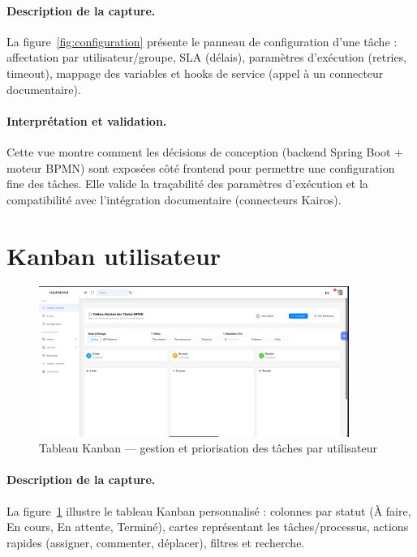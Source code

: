 \paragraph{Description de la capture.}  
La figure~\ref{fig:configuration} présente le panneau de configuration d’une tâche : affectation par utilisateur/groupe, SLA (délais), paramètres d’exécution (retries, timeout), mappage des variables et hooks de service (appel à un connecteur documentaire).

\paragraph{Interprétation et validation.}  
Cette vue montre comment les décisions de conception (backend Spring Boot + moteur BPMN) sont exposées côté frontend pour permettre une configuration fine des tâches. Elle valide la traçabilité des paramètres d’exécution et la compatibilité avec l’intégration documentaire (connecteurs Kairos).

\section{Kanban utilisateur}

\begin{figure}[H]
    \centering
    \includegraphics[width=0.9\textwidth]{Images/task.png}
    \caption{Tableau Kanban — gestion et priorisation des tâches par utilisateur}
    \label{fig:kanban}
\end{figure}

\paragraph{Description de la capture.}  
La figure~\ref{fig:kanban} illustre le tableau Kanban personnalisé : colonnes par statut (À faire, En cours, En attente, Terminé), cartes représentant les tâches/processus, actions rapides (assigner, commenter, déplacer), filtres et recherche.

